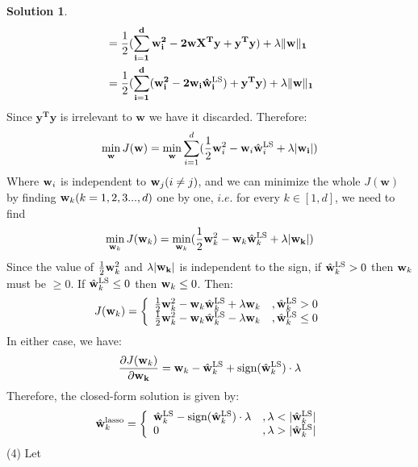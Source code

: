 \documentclass[a4paper,UTF8]{article}
\numberwithin{equation}{section}
\theoremstyle{definition}
\newtheorem*{solution}{Solution}
\begin{document}
\begin{solution}
\begin{equation}
\begin{split}
&=  \frac{1}{2} (\mathbf{\sum_{i=1}^{d} w_i^2 - 2wX^Ty+y^Ty)	 + \lambda  \| \mathbf{w}\|_1  } \\
&=  \frac{1}{2} (\mathbf{\sum_{i=1}^{d} (w_i^2 - 2w_i \hat{\mathbf{w}}^{{\small \text{LS}}}_i) + y^Ty)	 + \lambda  \| \mathbf{w}\|_1  } 
\end{split}
\end{equation}
Since $\mathbf{y^Ty}$ is irrelevant to $\mathbf{w}$ we have it discarded. Therefore:
\begin{equation}
\min_{\mathbf{w}}J(\mathbf{w})  =\min_{\mathbf{w}} \sum_{i=1}^{d}(\frac{1}{2} \mathbf{w}_i^2 - \mathbf{w}_i \hat{\mathbf{w}}^{{\small \text{LS}}}_i +  \lambda |\mathbf{\mathbf{w}_i}|) 
\end{equation}
Where $\mathbf{w}_i$ is independent to $\mathbf{w}_j (i \neq j)$, and we can minimize the whole $J(\mathbf{w})$ by finding $\mathbf{w}_k (k = 1, 2, 3 ..., d)$ one by one, $\textit{i.e}$. for every $k \in [1, d]$, we need to find
\begin{equation} 
\min_{\mathbf{w}_k}J(\mathbf{w}_k) = \min_{\mathbf{w}_k} (\frac{1}{2} \mathbf{w}_k^2 - \mathbf{w}_k \hat{\mathbf{w}}^{{\small \text{LS}}}_k +  \lambda |\mathbf{\mathbf{w}_k}|)
\end{equation}
Since the value of $\frac{1}{2} \mathbf{w}_k^2$ and $\lambda |\mathbf{\mathbf{w}_k}|$ is independent to the sign, if  $\hat{\mathbf{w}}^{{\small \text{LS}}}_k > 0$ then $\mathbf{w}_k$ must be $\geq 0$.  If $\hat{\mathbf{w}}^{{\small \text{LS}}}_k \leq 0$ then $\mathbf{w}_k \leq 0$. 
Then:
\begin{equation} 
\label{J:w_k}
J(\mathbf{w}_k) = \left\{ \begin{array}{ll}
 \frac{1}{2} \mathbf{w}_k^2 - \mathbf{w}_k \hat{\mathbf{w}}^{{\small \text{LS}}}_k +  \lambda \mathbf{w}_k & ,\hat{\mathbf{w}}^{{\small \text{LS}}}_k > 0 \\
\frac{1}{2}  \mathbf{w}_k^2 - \mathbf{w}_k \hat{\mathbf{w}}^{{\small \text{LS}}}_k -  \lambda  \mathbf{w}_k  &,\hat{\mathbf{w}}^{{\small \text{LS}}}_k \leq 0
  \end{array} \right.
\end{equation}
In either case, we have:
\begin{equation}
\frac{\partial J(\mathbf{w}_k)}{\partial\mathbf{w_k}} = \mathbf{w}_k -  \hat{\mathbf{w}}^{{\small \text{LS}}}_k +  \text{sign}(\hat{\mathbf{w}}^{{\small \text{LS}}}_k) \cdot \lambda
\end{equation}
Therefore, the closed-form solution is given by:\footnotemark
\begin{equation}
\hat{\mathbf{w}}^{{\text{lasso}}}_k = \left\{ \begin{array}{ll}
\hat{\mathbf{w}}^{{\small \text{LS}}}_k - \text{sign}(\hat{\mathbf{w}}^{{\small \text{LS}}}_k) \cdot \lambda &, \lambda < |\hat{\mathbf{w}}^{{\small \text{LS}}}_k| \\
0  &, \lambda > |\hat{\mathbf{w}}^{{\small \text{LS}}}_k|
  \end{array} \right.
\end{equation}
\newcommand{\wlz}{\hat{\mathbf{w}}^{\ell_0}}
(4) Let
\begin{equation}

\end{equation}
\end{solution}
\end{document}
